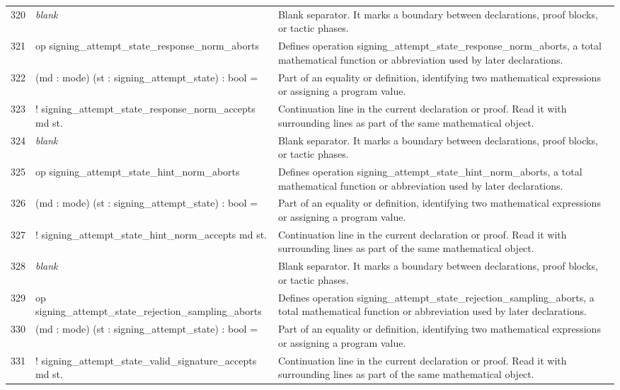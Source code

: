 \documentclass[10pt]{article}
\begin{document}
\begin{longtable}{r L{0.53\textwidth} L{0.37\textwidth}}
320 & {\ttfamily\scriptsize \emph{blank}} & Blank separator.  It marks a boundary between declarations, proof blocks, or tactic phases. \\
321 & {\ttfamily\scriptsize op signing\_attempt\_state\_response\_norm\_aborts} & Defines operation signing\_attempt\_state\_response\_norm\_aborts, a total mathematical function or abbreviation used by later declarations. \\
322 & {\ttfamily\scriptsize    (md : mode) (st : signing\_attempt\_state) : bool =} & Part of an equality or definition, identifying two mathematical expressions or assigning a program value. \\
323 & {\ttfamily\scriptsize   ! signing\_attempt\_state\_response\_norm\_accepts md st.} & Continuation line in the current declaration or proof.  Read it with surrounding lines as part of the same mathematical object. \\
324 & {\ttfamily\scriptsize \emph{blank}} & Blank separator.  It marks a boundary between declarations, proof blocks, or tactic phases. \\
325 & {\ttfamily\scriptsize op signing\_attempt\_state\_hint\_norm\_aborts} & Defines operation signing\_attempt\_state\_hint\_norm\_aborts, a total mathematical function or abbreviation used by later declarations. \\
326 & {\ttfamily\scriptsize    (md : mode) (st : signing\_attempt\_state) : bool =} & Part of an equality or definition, identifying two mathematical expressions or assigning a program value. \\
327 & {\ttfamily\scriptsize   ! signing\_attempt\_state\_hint\_norm\_accepts md st.} & Continuation line in the current declaration or proof.  Read it with surrounding lines as part of the same mathematical object. \\
328 & {\ttfamily\scriptsize \emph{blank}} & Blank separator.  It marks a boundary between declarations, proof blocks, or tactic phases. \\
329 & {\ttfamily\scriptsize op signing\_attempt\_state\_rejection\_sampling\_aborts} & Defines operation signing\_attempt\_state\_rejection\_sampling\_aborts, a total mathematical function or abbreviation used by later declarations. \\
330 & {\ttfamily\scriptsize    (md : mode) (st : signing\_attempt\_state) : bool =} & Part of an equality or definition, identifying two mathematical expressions or assigning a program value. \\
331 & {\ttfamily\scriptsize   ! signing\_attempt\_state\_valid\_signature\_accepts md st.} & Continuation line in the current declaration or proof.  Read it with surrounding lines as part of the same mathematical object. \\

\end{longtable}
\end{document}
